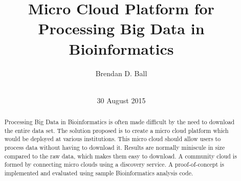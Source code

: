 \documentclass{sig-alternate-05-2015}
\begin{document}


\title{Micro Cloud Platform for Processing Big Data in Bioinformatics}

\author{
\alignauthor
Brendan D. Ball\\
       \\
}

\date{30 August 2015}


\maketitle
\begin{abstract}
Processing Big Data in Bioinformatics is often made difficult by the need to download the entire data set. The solution proposed is to create a micro cloud platform which would be deployed at various institutions. This micro cloud should allow users to process data without having to download it. Results are normally miniscule in size compared to the raw data, which makes them easy to download. A community cloud is formed by connecting micro clouds using a discovery service. A proof-of-concept is implemented and evaluated using sample Bioinformatics analysis code.
\end{abstract}
\end{document}
